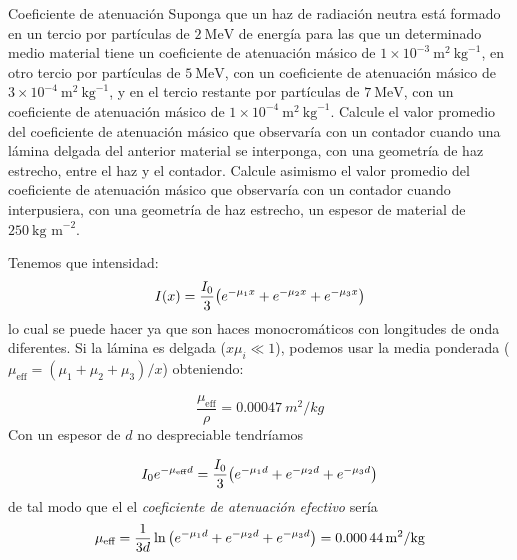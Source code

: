 
\begin{Ejercicio}{Coeficiente de atenuación }
Suponga que un haz de radiación neutra está formado en un tercio por partículas de $2\ \text{MeV}$ de energía para las que un determinado medio material tiene un coeficiente de atenuación másico de $1 \times 10^{-3}\ \text{m}^2\ \text{kg}^{-1}$, en otro tercio por partículas de $5\ \text{MeV}$, con un coeficiente de atenuación másico de $3 \times 10^{-4}\ \text{m}^2\ \text{kg}^{-1}$, y en el tercio restante por partículas de $7\ \text{MeV}$, con un coeficiente de atenuación másico de $1 \times 10^{-4}\ \text{m}^2\ \text{kg}^{-1}$. Calcule el valor promedio del coeficiente de atenuación másico que observaría con un contador cuando una lámina delgada del anterior material se interponga, con una geometría de haz estrecho, entre el haz y el contador. Calcule asimismo el valor promedio del coeficiente de atenuación másico que observaría con un contador cuando interpusiera, con una geometría de haz estrecho, un espesor de material de $250\ \text{kg m}^{-2}$.
\end{Ejercicio}

Tenemos que intensidad:
\begin{equation}
    I(x) = \frac{I_0}{3}\pqty{e^{-\mu_1 x}+e^{-\mu_2 x} + e^{-\mu_3x}}
\end{equation}
lo cual se puede hacer ya que son haces monocromáticos con longitudes de onda diferentes. Si la lámina es delgada ($x \mu_i \ll 1$), podemos usar la media ponderada ($\mu_{\text{eff}} = (\mu_1 + \mu_2 + \mu_3)/x$) obteniendo: 

\begin{equation}
    \frac{\mu_{\text{eff}}}{\rho} = \SI{0.00047}{m^2 / kg}    
\end{equation}
Con un espesor de $d$ no despreciable tendríamos

\begin{equation}
    I_0 e^{-\mu_{\text{eff}} d} = \frac{I_0}{3}\pqty{e^{-\mu_1 d}+e^{-\mu_2 d} + e^{-\mu_3 d}}
\end{equation}
de tal modo que el el \textit{coeficiente de atenuación efectivo} sería
\begin{equation}
    \mu_{\text{eff}} =  \frac{1}{3d} \ln \pqty{e^{-\mu_1 d}+e^{-\mu_2 d} + e^{-\mu_3 d}} = \SI{0.00044}{m^2/kg}
\end{equation}